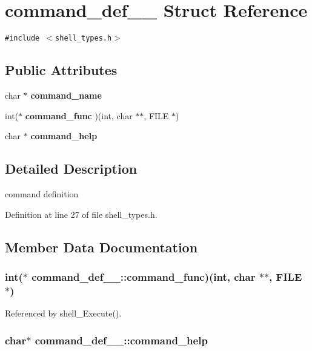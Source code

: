 \section{command\_\-def\_\-\_\- Struct Reference}
\label{structcommand__def____}
{\tt \#include $<$shell\_\-types.h$>$}

\subsection*{Public Attributes}
\begin{CompactItemize}
\item 
char $\ast$ {\bf command\_\-name}
\item 
int($\ast$ {\bf command\_\-func} )(int, char $\ast$$\ast$, FILE $\ast$)
\item 
char $\ast$ {\bf command\_\-help}
\end{CompactItemize}


\subsection{Detailed Description}
command definition 



Definition at line 27 of file shell\_\-types.h.

\subsection{Member Data Documentation}
\subsubsection{\setlength{\rightskip}{0pt plus 5cm}int($\ast$ {\bf command\_\-def\_\-\_\-::command\_\-func})(int, char $\ast$$\ast$, FILE $\ast$)}\label{structcommand__def_____o1}




Referenced by shell\_\-Execute().
\subsubsection{\setlength{\rightskip}{0pt plus 5cm}char$\ast$ {\bf command\_\-def\_\-\_\-::command\_\-help}}\label{structcommand__def_____o2}




